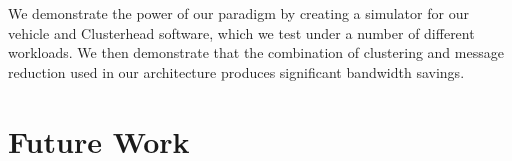 \documentclass{thesis}
\begin{document}
    We demonstrate the power of our paradigm by creating a simulator for our vehicle and Clusterhead software,
    which we test under a number of different workloads. We then demonstrate that the combination of clustering
    and message reduction used in our architecture produces significant bandwidth savings.

\section{Future Work}

\begin{singlespace}


% 
%

\end{singlespace}
\end{document}

